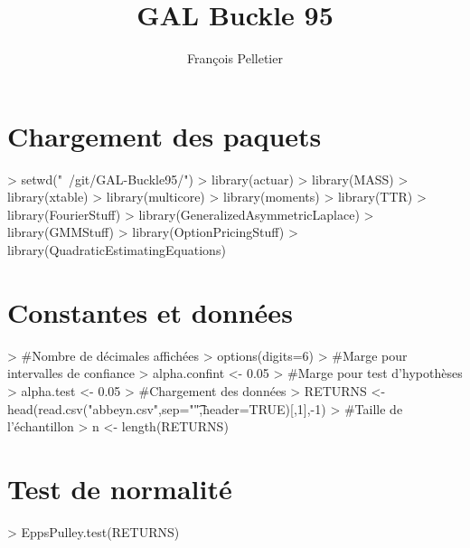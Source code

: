 \documentclass{report}
\begin{document}


\title{GAL Buckle 95}
\author{François Pelletier}
\maketitle
\tableofcontents

\section{Chargement des paquets}
\begin{Schunk}
\begin{Sinput}
> setwd("~/git/GAL-Buckle95/")
> library(actuar)
> library(MASS)
> library(xtable)
> library(multicore)
> library(moments)
> library(TTR)
> library(FourierStuff)
> library(GeneralizedAsymmetricLaplace)
> library(GMMStuff)
> library(OptionPricingStuff)
> library(QuadraticEstimatingEquations)
\end{Sinput}
\end{Schunk}

\section{Constantes et données}

\begin{Schunk}
\begin{Sinput}
> #Nombre de décimales affichées
> options(digits=6)
> #Marge pour intervalles de confiance
> alpha.confint <- 0.05 
> #Marge pour test d'hypothèses
> alpha.test <- 0.05
> #Chargement des données
> RETURNS <- head(read.csv("abbeyn.csv",sep="\t",header=TRUE)[,1],-1)
> #Taille de l'échantillon
> n <- length(RETURNS)
\end{Sinput}
\end{Schunk}

\section{Test de normalité}

\begin{Schunk}
\begin{Sinput}
> EppsPulley.test(RETURNS)
\end{Sinput}
\end{Schunk}
\end{document}
